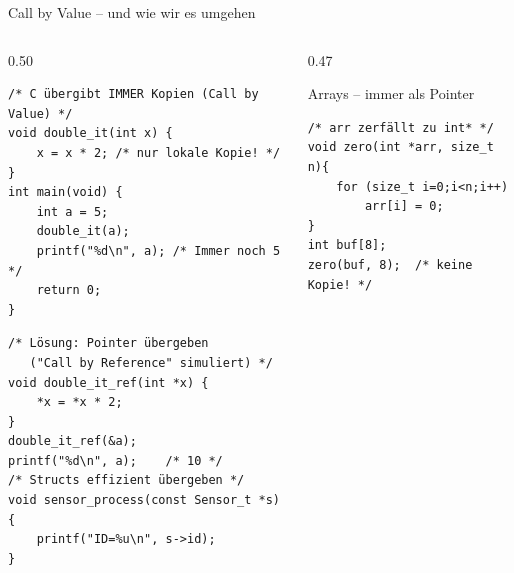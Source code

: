 \documentclass[%
  aspectratio=169,
  10pt
]{beamer}
\begin{document}
\begin{frame}[fragile]{Call by Value -- und wie wir es umgehen}
  \begin{columns}[T]
    \begin{column}{0.50\textwidth}
\begin{lstlisting}
/* C übergibt IMMER Kopien (Call by Value) */
void double_it(int x) {
    x = x * 2; /* nur lokale Kopie! */
}
int main(void) {
    int a = 5;
    double_it(a);
    printf("%d\n", a); /* Immer noch 5 */
    return 0;
}
\end{lstlisting}
      \vspace{0.3em}
\begin{lstlisting}
/* Lösung: Pointer übergeben
   ("Call by Reference" simuliert) */
void double_it_ref(int *x) {
    *x = *x * 2;
}
double_it_ref(&a);
printf("%d\n", a);    /* 10 */
/* Structs effizient übergeben */
void sensor_process(const Sensor_t *s) {
    printf("ID=%u\n", s->id);
}
\end{lstlisting}
    \end{column}
    \begin{column}{0.47\textwidth}

      \vspace{0.4em}
      \begin{block}{Arrays -- immer als Pointer}
\begin{lstlisting}
/* arr zerfällt zu int* */
void zero(int *arr, size_t n){
    for (size_t i=0;i<n;i++)
        arr[i] = 0;
}
int buf[8];
zero(buf, 8);  /* keine Kopie! */
\end{lstlisting}
      \end{block}
    \end{column}
  \end{columns}
\end{frame}
\end{document}
